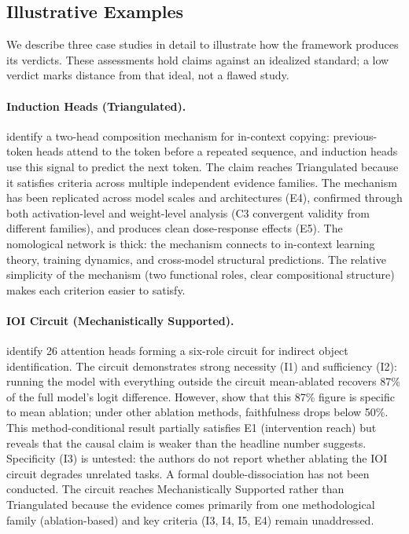 \documentclass[10pt]{article}
\begin{document}
\subsection{Illustrative Examples}

We describe three case studies in detail to illustrate how the framework produces its verdicts. These assessments hold claims against an idealized standard; a low verdict marks distance from that ideal, not a flawed study.

\paragraph{Induction Heads (Triangulated).} \citet{olsson2022context} identify a two-head composition mechanism for in-context copying: previous-token heads attend to the token before a repeated sequence, and induction heads use this signal to predict the next token. The claim reaches Triangulated because it satisfies criteria across multiple independent evidence families. The mechanism has been replicated across model scales and architectures (E4), confirmed through both activation-level and weight-level analysis (C3 convergent validity from different families), and produces clean dose-response effects (E5). The nomological network is thick: the mechanism connects to in-context learning theory, training dynamics, and cross-model structural predictions. The relative simplicity of the mechanism (two functional roles, clear compositional structure) makes each criterion easier to satisfy.

\paragraph{IOI Circuit (Mechanistically Supported).} \citet{wang2023interpretability} identify 26 attention heads forming a six-role circuit for indirect object identification. The circuit demonstrates strong necessity (I1) and sufficiency (I2): running the model with everything outside the circuit mean-ablated recovers 87\% of the full model's logit difference. However, \citet{miller2024transformer} show that this 87\% figure is specific to mean ablation; under other ablation methods, faithfulness drops below 50\%. This method-conditional result partially satisfies E1 (intervention reach) but reveals that the causal claim is weaker than the headline number suggests. Specificity (I3) is untested: the authors do not report whether ablating the IOI circuit degrades unrelated tasks. A formal double-dissociation has not been conducted. The circuit reaches Mechanistically Supported rather than Triangulated because the evidence comes primarily from one methodological family (ablation-based) and key criteria (I3, I4, I5, E4) remain unaddressed.
\end{document}
